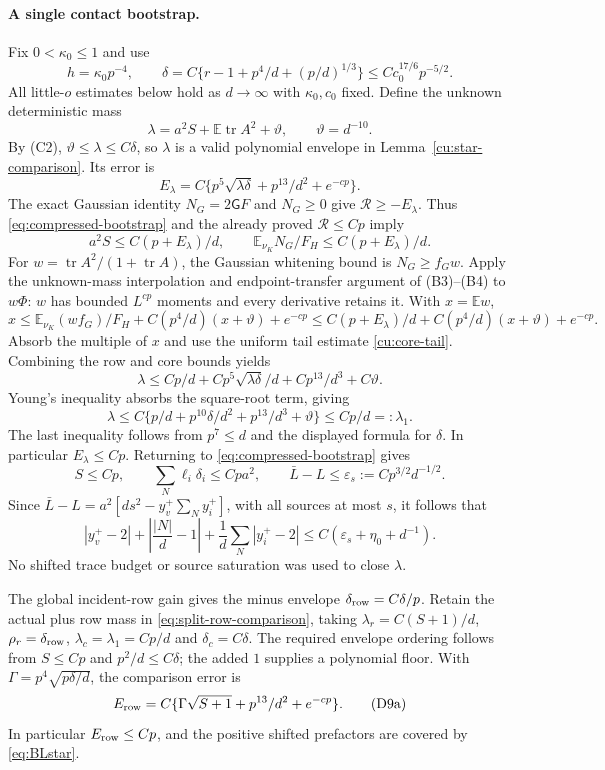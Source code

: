 \documentclass[10pt]{article}
\numberwithin{equation}{section}
\newcommand{\1}{\mathbf1}
\begin{document}
\paragraph{A single contact bootstrap.}
Fix $0<\kappa_0\le1$ and use
\[
 h=\kappa_0p^{-4},\qquad
 \delta=C\{r-1+p^4/d+(p/d)^{1/3}\}
           \le Cc_0^{17/6}p^{-5/2}.
 \tag{D5}\label{eq:compressed-shift}
\]
All little-$o$ estimates below hold as $d\to\infty$ with
$\kappa_0,c_0$ fixed. Define the unknown deterministic mass
\[
 \lambda=a^2S+\mathbb E\operatorname{tr}A^2+\vartheta,
 \qquad \vartheta=d^{-10}.
\]
By (C2), $\vartheta\le\lambda\le C\delta$, so $\lambda$ is a valid
polynomial envelope in Lemma~\ref{cu:star-comparison}. Its error is
\[
 E_\lambda=C\{p^5\sqrt{\lambda\delta}+p^{13}/d^2+e^{-cp}\}.
\]
The exact Gaussian identity $N_G=2\mathsf GF$ and $N_G\ge0$ give
$\mathcal R\ge-E_\lambda$. Thus \eqref{eq:compressed-bootstrap}
and the already proved $\mathcal R\le Cp$ imply
\[
 a^2S\le C(p+E_\lambda)/d,
 \qquad \mathbb E_{\nu_K}N_G/F_H\le C(p+E_\lambda)/d.
\]
For $w=\operatorname{tr}A^2/(1+\operatorname{tr}A)$, the Gaussian
whitening bound is $N_G\ge f_Gw$.
Apply the unknown-mass interpolation and endpoint-transfer argument
of (B3)--(B4) to $w\Phi$: $w$ has bounded $L^{cp}$ moments and
every derivative retains it. With $x=\mathbb Ew$,
\[
 x\le\mathbb E_{\nu_K}(wf_G)/F_H
                   +C(p^4/d)(x+\vartheta)+e^{-cp}
   \le C(p+E_\lambda)/d+C(p^4/d)(x+\vartheta)+e^{-cp}.
\]
Absorb the multiple of $x$ and use the uniform tail estimate
\eqref{cu:core-tail}. Combining the row and core bounds yields
\[
 \lambda\le Cp/d+Cp^5\sqrt{\lambda\delta}/d
                         +Cp^{13}/d^3+C\vartheta.
\]
Young's inequality absorbs the square-root term, giving
\[
 \lambda\le C\{p/d+p^{10}\delta/d^2+p^{13}/d^3+\vartheta\}
       \le Cp/d=:\lambda_1.
 \tag{D6}\label{eq:compressed-row-bootstrap}
\]
The last inequality follows from $p^7\le d$ and the displayed
formula for $\delta$. In particular $E_\lambda\le Cp$.
Returning to \eqref{eq:compressed-bootstrap} gives
\[
 S\le Cp,\qquad \sum_N\ell_i\delta_i\le Cp a^2,\qquad
 \bar L-L\le\varepsilon_s:=Cp^{3/2}d^{-1/2}.
 \tag{D7}\label{eq:compressed-saturation}
\]
Since $\bar L-L=a^2[ds^2-y_v^+\sum_Ny_i^+]$, with all sources at
most $s$, it follows that
\[
 |y_v^+-2|+\left|\frac{|N|}{d}-1\right|
       +\frac1d\sum_N|y_i^+-2|
       \le C(\varepsilon_s+\eta_0+d^{-1}).
 \tag{D8}\label{eq:compressed-profile-saturation}
\]
No shifted trace budget or source saturation was used to close
$\lambda$.

The global incident-row gain gives the minus envelope
$\delta_{\rm row}=C\delta/p$. Retain the actual plus row mass in
\eqref{eq:split-row-comparison}, taking
$\lambda_r=C(S+1)/d$, $\rho_r=\delta_{\rm row}$,
$\lambda_c=\lambda_1=Cp/d$ and $\delta_c=C\delta$.
The required envelope ordering follows from $S\le Cp$ and
$p^2/d\le C\delta$; the added $1$ supplies a polynomial floor.
With $\Gamma=p^4\sqrt{p\delta/d}$, the comparison error is
\[
 E_{\rm row}=C\{\Gamma\sqrt{S+1}+p^{13}/d^2+e^{-cp}\}.
 \tag{D9a}\label{eq:postcontact-row-error}
\]
In particular $E_{\rm row}\le Cp$, and the positive shifted prefactors
are covered by \eqref{eq:BLstar}.
\end{document}
